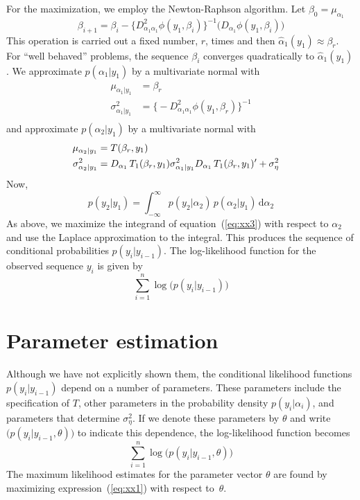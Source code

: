 For the maximization, we employ the Newton-Raphson algorithm. 
Let $\beta_0=\mu_{\alpha_1}$
\begin{equation}
 \beta_{i+1}=\beta_i-\big\{D^2_{\alpha_1\alpha_1}\phi(y_1,\beta_i)\big\}^{-1}
  \big(D_{\alpha_1}\phi(y_1,\beta_i) \big)
\end{equation}
This operation is carried out a fixed number, $r$, times and then
$\hat\alpha_1(y_1)\approx\beta_r$.
For ``well behaved'' problems, the sequence $\beta_i$ converges
quadratically to $\hat\alpha_1(y_1)$.
We approximate $p(\alpha_1|y_1)$ by a multivariate normal with
\begin{align*}
  \mu_{\alpha_1|y_1}&=\beta_r\\[6pt]
  \sigma^2_{\alpha_1|y_1}&=
  \big\{-D^2_{\alpha_1\alpha_1}\phi(y_1,\beta_r)\big\}^{-1}\\
\end{align*}
and approximate $p(\alpha_2|y_1)$ by a multivariate normal with
\begin{align*}
  \mu_{\alpha_2|y_1}&=T(\beta_r,y_1)\cr 
  \sigma^2_{\alpha_2|y_1}&= 
  D_{\alpha_1}\, T_1(\beta_r,y_1)\sigma^2_{\alpha_1|y_1}
  D_{\alpha_1}\, T_1(\beta_r,y_1) ^{\prime}+
  \sigma^2_\eta\cr
\end{align*}
Now,
\begin{equation}\label{eq:xx3}
  p(y_2|y_1)=\int_{-\infty}^\infty p(y_2|\alpha_2)\, p(\alpha_2|y_1)
  \,\textrm{d}\alpha_2
\end{equation}
As above, we maximize the integrand of equation~(\ref{eq:xx3}) with respect to
$\alpha_2$ and use the Laplace approximation to the integral.
This produces the sequence of conditional probabilities $p(y_i|y_{i-1})$.
The log-likelihood function for the observed sequence ${y_i}$
is given by 
\begin{equation}
  \sum_{i=1}^n \log\Big(p(y_i|y_{i-1})\Big)
\end{equation}


\section{Parameter estimation}

Although we have not explicitly shown them, the conditional likelihood
functions $p(y_i|y_{i-1})$  depend on a number of 
parameters. These parameters include the specification of $T$, other
parameters in the probability density $p(y_i|\alpha_i)$, and parameters
that determine $\sigma^2_\eta$. If we denote these parameters by
$\theta$ and write $\big(p(y_i|y_{i-1},\theta)\big)$ to indicate this
dependence, the log-likelihood function becomes
\begin{equation}\label{eq:xx1}
  \sum_{i=1}^n \log\Big(p(y_i|y_{i-1},\theta)\Big)
\end{equation}
The maximum likelihood estimates for the parameter vector $\theta$ are
found by maximizing expression~(\ref{eq:xx1}) with respect to~$\theta$.


